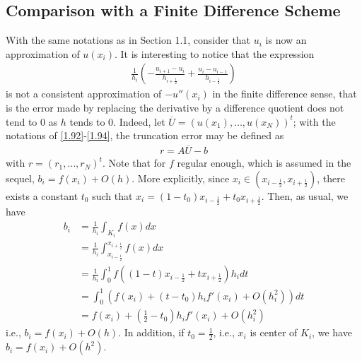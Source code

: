 \documentclass[a4paper]{article}
\numberwithin{equation}{section}
\begin{document}
\subsection{Comparison with a Finite Difference Scheme}
With the same notations as in Section 1.1, consider that $u_i$ is now an approximation of $u\left(x_i\right)$. It is interesting to notice that the expression
\begin{align}
\frac{1}{{{h_i}}}\left( { - \frac{{{u_{i + 1}} - {u_i}}}{{{h_{i + \frac{1}{2}}}}} + \frac{{{u_i} - {u_{i - 1}}}}{{{h_{i - \frac{1}{2}}}}}} \right)
\end{align}
is not a consistent approximation of $-u''\left(x_i\right)$ in the finite difference sense, that is the error made by replacing the derivative by a difference quotient does not tend to 0 as $h$ tends to 0. Indeed, let $\overline U  = {\left( {u\left( {{x_1}} \right), \ldots ,u\left( {{x_N}} \right)} \right)^t}$; with the notations of \eqref{1.92}-\eqref{1.94}, the truncation error may be defined as
\begin{align}
r = A\overline U  - b
\end{align}
with $r = {\left( {{r_1}, \ldots ,{r_N}} \right)^t}$. Note that for $f$ regular enough, which is assumed in the sequel, ${b_i} = f\left( {{x_i}} \right) + O\left( h \right)$. More explicitly, since ${x_i} \in \left( {{x_{i - \frac{1}{2}}},{x_{i + \frac{1}{2}}}} \right)$, there exists a constant $t_0$ such that ${x_i} = \left( {1 - {t_0}} \right){x_{i - \frac{1}{2}}} + {t_0}{x_{i + \frac{1}{2}}}$. Then, as usual, we have
\begin{align}
{b_i} &= \frac{1}{{{h_i}}}\int_{{K_i}} {f\left( x \right)dx} \\
& = \frac{1}{{{h_i}}}\int_{{x_{i - \frac{1}{2}}}}^{{x_{i + \frac{1}{2}}}} {f\left( x \right)dx} \\
& = \frac{1}{{{h_i}}}\int_0^1 {f\left( {\left( {1 - t} \right){x_{i - \frac{1}{2}}} + t{x_{i + \frac{1}{2}}}} \right){h_i}dt} \\
 &= \int_0^1 {\left( {f\left( {{x_i}} \right) + \left( {t - {t_0}} \right){h_i}f'\left( {{x_i}} \right) + O\left( {h_i^2} \right)} \right)dt} \\
 &= f\left( {{x_i}} \right) + \left( {\frac{1}{2} - {t_0}} \right){h_i}f'\left( {{x_i}} \right) + O\left( {h_i^2} \right)
\end{align}
i.e., ${b_i} = f\left( {{x_i}} \right) + O\left( h \right)$. In addition, if $t_0=\frac{1}{2}$, i.e., $x_i$ is center of $K_i$, we have ${b_i} = f\left( {{x_i}} \right) + O\left( h^2 \right)$.
\end{document}
